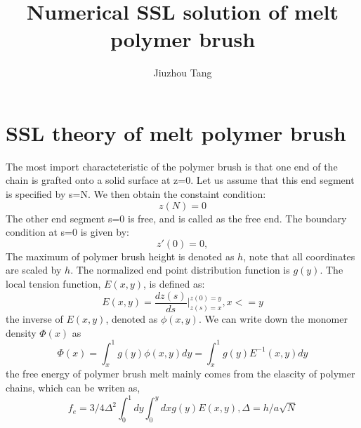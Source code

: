 \documentclass{article}
\title{Numerical SSL solution of melt polymer brush }
\author{Jiuzhou Tang}
\begin{document}
\maketitle

\begin{abstract}

\end{abstract}

\section{SSL theory of melt polymer brush}
The most import characteteristic of the polymer brush is that one end of the chain is grafted onto a solid surface at z=0. Let us
assume that this end segment is specified by s=N. We then obtain the constaint condition:
\begin{equation}
 z(N)=0
\end{equation}
The other end segment s=0 is free, and is called as the free end. The boundary condition at s=0 is given by:
\begin{equation}
 z'(0)=0,
\end{equation}
The maximum of polymer brush height is denoted as $h$, note that all coordinates are scaled by $h$. The normalized end point distribution function is $g(y)$.
The local tension function, $E(x,y)$, is defined as:
\begin{equation}
 E(x,y)=\frac{dz(s)}{ds}|^{z(0)=y}_{z(s)=x}, x<=y
\end{equation}
the inverse of $E(x,y)$, denoted as $\phi(x,y)$.
We can write down the monomer density $\Phi(x)$ as
\begin{equation}
 \Phi(x)=\int^{1}_{x} g(y)\phi(x,y)dy=\int^{1}_{x} g(y)E^{-1}(x,y)dy
 \label{eqn:dens}
 \end{equation}
the free energy of polymer brush melt mainly comes from the elascity of polymer chains, which can be writen as,
\begin{equation}
 f_{e}=3/4\Delta^2\int^{1}_{0}dy\int^{y}_{0}dxg(y)E(x,y),  \Delta=h/a\sqrt{N}
\end{equation}
\end{document}
